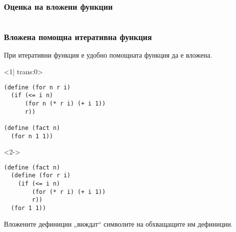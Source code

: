 \documentclass[alsotrans,beameroptions={aspectratio=169}]{beamerswitch}
\begin{document}
\begin{frame}
  \frametitle{Оценка на вложени функции}

  \sizeboth\scriptsize
  \begin{fixedarea}
    \begin{columns}[T,onlytextwidth]
      \begin{column}{.5\textwidth}
      \end{column}
      \begin{column}{.5\textwidth}
      \end{column}
    \end{columns}
  \end{fixedarea}
\end{frame}

\begin{frame}[fragile]
  \frametitle{Вложена помощна итеративна функция}

  При итеративни функция е удобно помощната функция да е вложена.
  \begin{fixedarea}[.5]
    \begin{onlyenv}<1| trans:0>
\begin{lstlisting}
(define (for n r i)
  (if (<= i n)
      (for n (* r i) (+ i 1))
      r))

(define (fact n)
  (for n 1 1))
\end{lstlisting}
    \end{onlyenv}
    \begin{onlyenv}<2->
\begin{lstlisting}
(define (fact n)
  (define (for r i)
    (if (<= i n)
        (for (* r i) (+ i 1))
        r))
  (for 1 1))
\end{lstlisting}
    \end{onlyenv}
  \end{fixedarea}
  Вложените дефиниции „виждат“ символите на обхващащите им дефиниции.
\end{frame}
\end{document}
